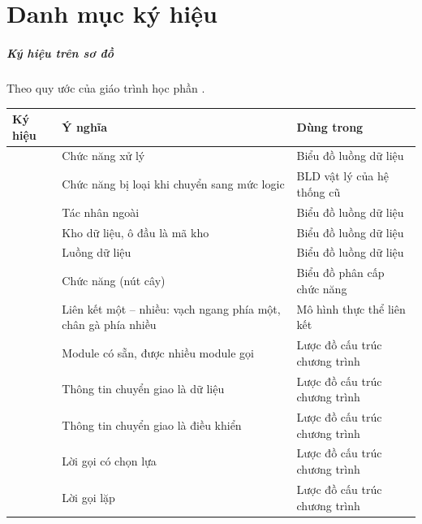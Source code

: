 \chapter*{Danh mục ký hiệu}

\paragraph{Ký hiệu trên sơ đồ} Theo quy ước của giáo trình học phần \cite{tung_qlhttt}.

{\small
\begin{longtable}{>{\centering\arraybackslash}m{2.4cm} L{5.4cm} p{6.4cm}}
\toprule
\textbf{Ký hiệu} & \textbf{Ý nghĩa} & \textbf{Dùng trong} \\
\midrule
\endhead
{} & Chức năng xử lý & Biểu đồ luồng dữ liệu \\
 & Chức năng bị loại khi chuyển sang mức logic & BLD vật lý của hệ thống cũ \\
 & Tác nhân ngoài & Biểu đồ luồng dữ liệu \\
 & Kho dữ liệu, ô đầu là mã kho & Biểu đồ luồng dữ liệu \\
 & Luồng dữ liệu & Biểu đồ luồng dữ liệu \\
 & Chức năng (nút cây) & Biểu đồ phân cấp chức năng \\
 & Liên kết một -- nhiều: vạch ngang phía một, chân gà phía nhiều & Mô hình thực thể liên kết \\
 & Module có sẵn, được nhiều module gọi & Lược đồ cấu trúc chương trình \\
 & Thông tin chuyển giao là dữ liệu & Lược đồ cấu trúc chương trình \\
 & Thông tin chuyển giao là điều khiển & Lược đồ cấu trúc chương trình \\
 & Lời gọi có chọn lựa & Lược đồ cấu trúc chương trình \\
 & Lời gọi lặp & Lược đồ cấu trúc chương trình \\
\bottomrule
\end{longtable}
}

